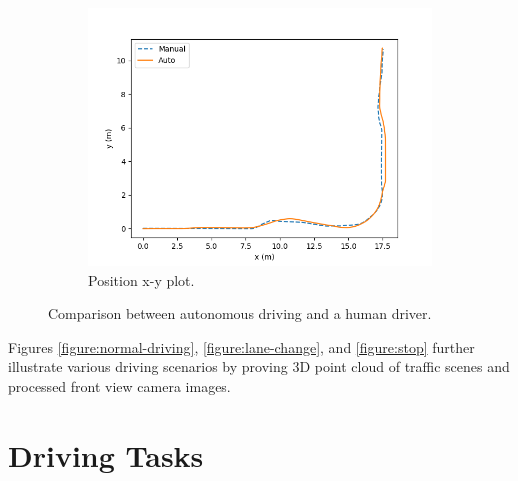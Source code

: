 \begin{figure}[h]
\begin{subfigure}[b]{0.45\linewidth}
    \includegraphics[width=\linewidth]{figures/experiments/position-plot.png}
    \caption{Position x-y plot.}
  \end{subfigure}
  \caption[Comparison between autonomous driving and a human driver]{Comparison
    between autonomous driving and a human driver.}
  \label{figure:driving-comparison}
\end{figure}


Figures \ref{figure:normal-driving}, \ref{figure:lane-change}, and
\ref{figure:stop} further illustrate various driving scenarios by proving 3D
point cloud of traffic scenes and processed front view camera images.


\section{Driving Tasks}

